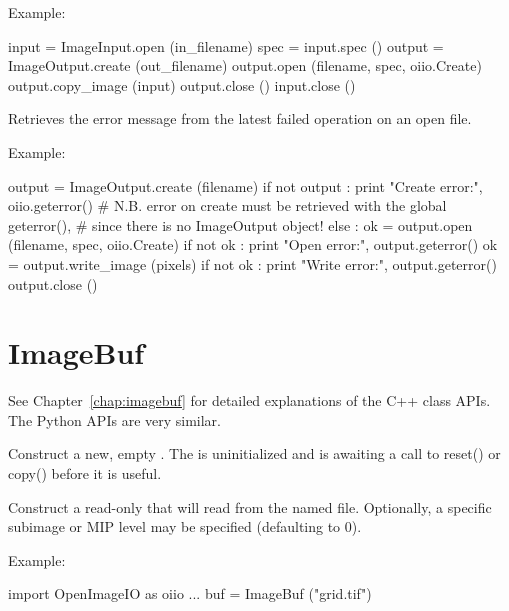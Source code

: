 \noindent Example:
\begin{code}
    input = ImageInput.open (in_filename)
    spec = input.spec ()
    output = ImageOutput.create (out_filename)
    output.open (filename, spec, oiio.Create)
    output.copy_image (input)
    output.close ()
    input.close ()
\end{code}
\apiend

Retrieves the error message from the latest failed operation on an open
file.

\noindent Example:
\begin{code}
    output = ImageOutput.create (filename)
    if not output :
        print "Create error:", oiio.geterror()
        # N.B. error on create must be retrieved with the global geterror(),
        # since there is no ImageOutput object!
    else :
        ok = output.open (filename, spec, oiio.Create)
        if not ok :
            print "Open error:", output.geterror()
        ok = output.write_image (pixels)
        if not ok :
            print "Write error:", output.geterror()
        output.close ()
\end{code}
\apiend



\section{ImageBuf}
\label{sec:pythonimagebuf}

See Chapter~\ref{chap:imagebuf} for detailed explanations of the
C++ \ImageBuf class APIs. The Python APIs are very similar.

Construct a new, empty \ImageBuf. The \ImageBuf is uninitialized and is
awaiting a call to {\cf reset()} or {\cf copy()} before it is useful.
\apiend


Construct a read-only \ImageBuf that will read from the named file.
Optionally, a specific subimage or MIP level may be specified (defaulting to
0).

\noindent Example:
\begin{code}
    import OpenImageIO as oiio
    ...
    buf = ImageBuf ("grid.tif")
\end{code}
\apiend


